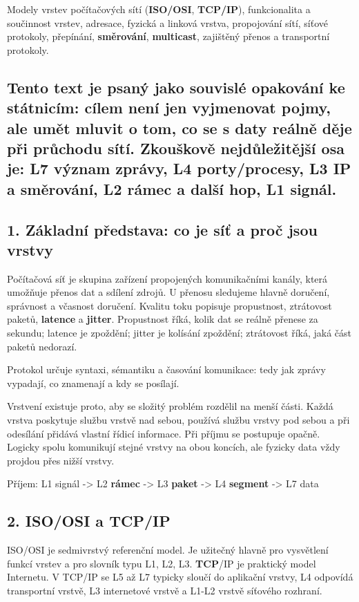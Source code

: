 \documentclass[11pt,a4paper]{article}
\begin{document}
Modely vrstev počítačových sítí (\textbf{ISO/OSI}, \textbf{TCP/IP}), funkcionalita a součinnost vrstev, adresace, fyzická a linková vrstva, propojování sítí, síťové protokoly, přepínání, \textbf{směrování}, \textbf{multicast}, zajištěný přenos a transportní protokoly.

\subsection*{Tento text je psaný jako souvislé opakování ke státnicím: cílem není jen vyjmenovat pojmy, ale umět mluvit o tom, co se s daty reálně děje při průchodu sítí. Zkouškově nejdůležitější osa je: L7 význam zprávy, L4 porty/procesy, L3 IP a směrování, L2 rámec a další hop, L1 signál.}

\subsection*{1. Základní představa: co je síť a proč jsou vrstvy}

Počítačová síť je skupina zařízení propojených komunikačními kanály, která umožňuje přenos dat a sdílení zdrojů. U přenosu sledujeme hlavně doručení, správnost a včasnost doručení. Kvalitu toku popisuje propustnost, ztrátovost paketů, \textbf{latence} a \textbf{jitter}. Propustnost říká, kolik dat se reálně přenese za sekundu; latence je zpoždění; jitter je kolísání zpoždění; ztrátovost říká, jaká část paketů nedorazí.

Protokol určuje syntaxi, sémantiku a časování komunikace: tedy jak zprávy vypadají, co znamenají a kdy se posílají.

Vrstvení existuje proto, aby se složitý problém rozdělil na menší části. Každá vrstva poskytuje službu vrstvě nad sebou, používá službu vrstvy pod sebou a při odesílání přidává vlastní řídicí informace. Při příjmu se postupuje opačně. Logicky spolu komunikují stejné vrstvy na obou koncích, ale fyzicky data vždy projdou přes nižší vrstvy.

Příjem: L1 signál -> L2 \textbf{rámec} -> L3 \textbf{paket} -> L4 \textbf{segment} -> L7 data

\subsection*{2. ISO/OSI a TCP/IP}

ISO/OSI je sedmivrstvý referenční model. Je užitečný hlavně pro vysvětlení funkcí vrstev a pro slovník typu L1, L2, L3. \textbf{TCP}/IP je praktický model Internetu. V TCP/IP se L5 až L7 typicky sloučí do aplikační vrstvy, L4 odpovídá transportní vrstvě, L3 internetové vrstvě a L1-L2 vrstvě síťového rozhraní.
\end{document}
